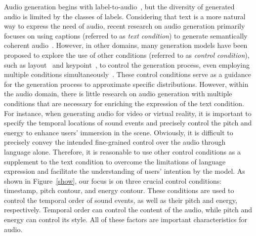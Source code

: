 \documentclass[letterpaper]{article} %
\begin{document}
Audio generation begins with label-to-audio~\cite{fullband2023pascual,csg2021liu}, but the diversity of generated audio is limited by the classes of labels. Considering that text is a more natural way to express the need of audio, recent research on audio generation primarily focuses on using captions (referred to as \textit{text condition}) to generate semantically coherent audio~\cite{yang2022diffsound,kreuk2022audiogen,liu2023audioldm,huang2023makeanaudio,ghosal2023tango}. However, in other domains, many generation models have been proposed to explore the use of other conditions (referred to as  \textit{control condition}), such as layout~\cite{li2021collagingcg} and keypoint~\cite{he2023latentkeypointgan}, to control the generation process, even employing multiple conditions simultaneously~\cite{li2023gligen}. These control conditions serve as a guidance for the generation process to approximate specific distributions. However, within the audio domain, there is little research on audio generation with multiple conditions that are necessary for enriching the expression of the text condition. For instance, when generating audio for video or virtual reality, it is important to specify the temporal locations of sound events and precisely control the pitch and energy to enhance users' immersion in the scene. Obviously, it is difficult to precisely convey the intended fine-grained control over the audio through language alone. Therefore, it is reasonable to use other control conditions as a supplement to the text condition to overcome the limitations of language expression and facilitate the understanding of users' intention by the model. As shown in Figure~\ref{show}, our focus is on three crucial control conditions: timestamp, pitch contour, and energy contour. These conditions are used to control the temporal order of sound events, as well as their pitch and energy, respectively. Temporal order can control the content of the audio, while pitch and energy can control its style. All of these factors are important characteristics for audio.
\end{document}
